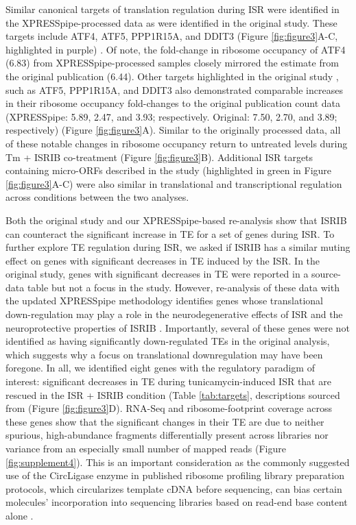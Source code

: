 \documentclass[10pt, oneside]{article}
\begin{document}
Similar canonical targets of translation regulation during ISR were identified in the XPRESSpipe-processed data as were identified in the original study. These targets include ATF4, ATF5, PPP1R15A, and DDIT3 (Figure \ref{fig:figure3}A-C, highlighted in purple) \cite{isrib_riboseq}. Of note, the fold-change in ribosome occupancy of ATF4 (6.83) from XPRESSpipe-processed samples closely mirrored the estimate from the original publication (6.44). Other targets highlighted in the original study \cite{isrib_riboseq}, such as ATF5, PPP1R15A, and DDIT3 also demonstrated comparable increases in their ribosome occupancy fold-changes to the original publication count data (XPRESSpipe: 5.89, 2.47, and 3.93; respectively. Original: 7.50, 2.70, and 3.89; respectively) (Figure \ref{fig:figure3}A). Similar to the originally processed data, all of these notable changes in ribosome occupancy return to untreated levels during Tm + ISRIB co-treatment (Figure \ref{fig:figure3}B). Additional ISR targets containing micro-ORFs described in the study (highlighted in green in Figure \ref{fig:figure3}A-C) were also similar in translational and transcriptional regulation across conditions between the two analyses. \par

Both the original study and our XPRESSpipe-based re-analysis show that ISRIB can counteract the significant increase in TE for a set of genes during ISR. To further explore TE regulation during ISR, we asked if ISRIB has a similar muting effect on genes with significant decreases in TE induced by the ISR. In the original study, genes with significant decreases in TE were reported in a source-data table but not a focus in the study. However, re-analysis of these data with the updated XPRESSpipe methodology identifies genes whose translational down-regulation may play a role in the neurodegenerative effects of ISR and the neuroprotective properties of ISRIB \cite{isrib_neuroprotective,isrib_neuroprotective2,isrib_neuroprotective3,isrib_neuroprotective4}. Importantly, several of these genes were not identified as having significantly down-regulated TEs in the original analysis, which suggests why a focus on translational downregulation may have been foregone. In all, we identified eight genes with the regulatory paradigm of interest: significant decreases in TE during tunicamycin-induced ISR that are rescued in the ISR + ISRIB condition (Table \ref{tab:targets}, descriptions sourced from \cite{genecards, ncbi, uniprot} (Figure \ref{fig:figure3}D). RNA-Seq and ribosome-footprint coverage across these genes show that the significant changes in their TE are due to neither spurious, high-abundance fragments differentially present across libraries nor variance from an especially small number of mapped reads (Figure \ref{fig:supplement4}). This is an important consideration as the commonly suggested use of the CircLigase enzyme in published ribosome profiling library preparation protocols, which circularizes template cDNA before sequencing, can bias certain molecules' incorporation into sequencing libraries based on read-end base content alone \cite{circligase_bias}. \par
\end{document}
